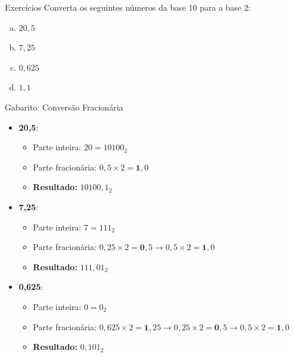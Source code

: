\begin{frame}{Exercícios}
    Converta os seguintes números da base 10 para a base 2:

    \begin{enumerate}[a)]
        \item $20,5$
        \item $7,25$
        \item $0,625$
        \item $1,1$
    \end{enumerate}
\end{frame}
\begin{frame}{Gabarito: Conversão Fracionária}
    \tiny
    \begin{itemize}
        \item[\textbf{a)}] \textbf{20,5}:
              \begin{itemize}
                  \item Parte inteira: $20 = 10100_2$
                  \item Parte fracionária: $0,5 \times 2 = \mathbf{1},0$
                  \item \textbf{Resultado:} $10100,1_2$
              \end{itemize}

        \item[\textbf{b)}] \textbf{7,25}:
              \begin{itemize}
                  \item Parte inteira: $7 = 111_2$
                  \item Parte fracionária: $0,25 \times 2 = \mathbf{0},5 \rightarrow 0,5 \times 2 = \mathbf{1},0$
                  \item \textbf{Resultado:} $111,01_2$
              \end{itemize}

        \item[\textbf{c)}] \textbf{0,625}:
              \begin{itemize}
                  \item Parte inteira: $0 = 0_2$
                  \item Parte fracionária: $0,625 \times 2 = \mathbf{1},25 \rightarrow 0,25 \times 2 = \mathbf{0},5 \rightarrow 0,5 \times 2 = \mathbf{1},0$
                  \item \textbf{Resultado:} $0,101_2$
              \end{itemize}


\end{itemize}
\end{frame}
